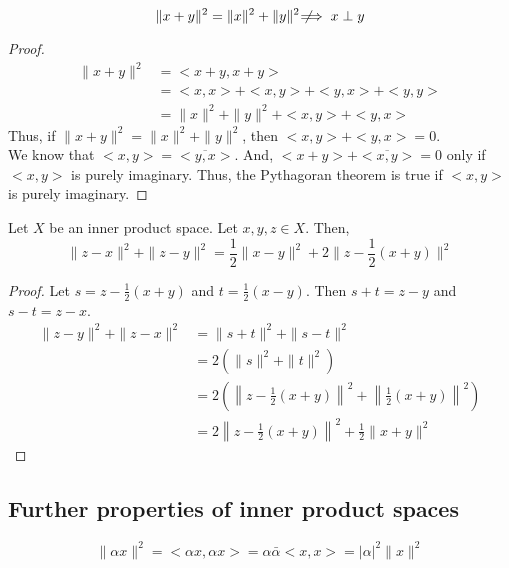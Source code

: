\begin{remark}
	\[ \|x+y\|^2 = \|x\|^2 + \|y\|^2 \not\!\!\!\implies x \perp y \]
\end{remark}
\begin{proof}
	\begin{align*}
		\|x+y\|^2 
		& = <x+y,x+y> \\
		& = <x,x> + <x,y> + <y,x> + <y,y> \\
		& = \|x\|^2 + \|y\|^2 + <x,y> + <y,x>
	\end{align*}
	Thus, if $\|x+y\|^2 = \|x\|^2 + \|y\|^2$, then $<x,y> +<y,x> = 0$.\\

	We know that $<x,y> = \overline{<y,x>}$.
	And, $<x+y>+\overline{<x,y>} = 0$ only if $<x,y>$ is purely imaginary.
	Thus, the Pythagoran theorem is true if $<x,y>$ is purely imaginary.
\end{proof}

\begin{theorem}
	Let $X$ be an inner product space.
	Let $x,y,z \in X$.
	Then,
	\[ \|z-x\|^2 + \|z-y\|^2 = \frac{1}{2} \|x-y\|^2 + 2\|z - \frac{1}{2}(x+y)\|^2 \]
\end{theorem}
\begin{proof}
	Let $s = z-\frac{1}{2}(x+y)$ and $t = \frac{1}{2}(x-y)$.
	Then $s+t = z-y$ and $s-t = z-x$.
	\begin{align*}
		\|z-y\|^2 + \|z-x\|^2 
		& = \|s+t\|^2 + \|s-t\|^2  \\
		& = 2(\|s\|^2 + \|t\|^2) \\
		& = 2\left(\left\|z-\frac{1}{2}(x+y)\right\|^2 + \left\|\frac{1}{2}(x+y)\right\|^2\right) \\
		& = 2\left\|z-\frac{1}{2}(x+y)\right\|^2 + \frac{1}{2} \|x+y\|^2
	\end{align*}
\end{proof}

\subsection{Further properties of inner product spaces}
\begin{remark}
	\[ \|\alpha x \|^2 = <\alpha x, \alpha x> = \alpha \bar{\alpha} <x,x> = |\alpha|^2 \|x\|^2 \]
\end{remark}

